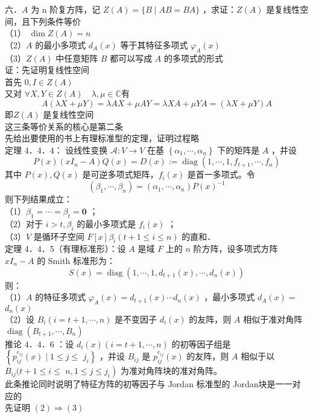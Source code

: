 \documentclass[UTF8]{ctexart}
\begin{document}
\noindent 六．$A$ 为 n 阶复方阵，记 $Z(A)=\{B \mid A B=B A\}$ ，求证：$Z(A)$ 是复线性空间，且下列条件等价\\
（1） $\operatorname{dim} Z(A)=n$\\
（2）$A$ 的最小多项式 $d_{A}(x)$ 等于其特征多项式 $\varphi_{A}(x)$\\
（3）$Z(A)$ 中任意矩阵 $B$ 都可以写成 $A$ 的多项式的形式\\
证：先证明复线性空间\\
首先 $0, I \in Z(A)$\\
又对 $\forall X, Y \in Z(A) \quad \lambda, \mu \in \mathbb{C}$有
$$A(\lambda X+\mu Y)=\lambda A X+\mu A Y=\lambda X A+\mu Y A=(\lambda X+\mu Y) A$$
即$Z(A)$ 是复线性空间\\
这三条等价关系的核心是第二条\\
先给出要使用的书上有理标准型的定理，证明过程略\\
定理 4．4．4： 设线性变换 $\mathcal{A}: V \rightarrow V$ 在基 $\left\{\alpha_{1}, \cdots, \alpha_{n}\right\}$ 下的矩阵是 $A$ ，并设
$$
P(x)\left(x I_{n}-A\right) Q(x)=D(x):=\operatorname{diag}\left(1, \cdots, 1, f_{t+1}, \cdots, f_{n}\right)
$$
其中 $P(x), Q(x)$ 是可逆多项式矩阵，$f_{i}(x)$ 是首一多项式。令
$$
\left(\beta_{1}, \cdots, \beta_{n}\right)=\left(\alpha_{1}, \cdots, \alpha_{n}\right) P(x)^{-1}
$$
则下列结果成立：\\
（1）$\beta_{1}=\cdots=\beta_{t}=\mathbf{0}$ ；\\
（2）对于 $i>t, \beta_{i}$ 的最小多项式是 $f_{i}(x)$ ；\\
（3）$V$ 是循环子空间 $F[x] \beta_{i}(t+1 \leq i \leq n)$ 的直和．\\
定理 4．4．5（有理标准形）：设 $A$ 是域 $F$ 上的 $n$ 阶方阵，设多项式方阵 $x I_{n}-A$ 的 Smith 标准形为：
$$S(x)=\operatorname{diag}\left(1, \cdots, 1, d_{t+1}(x), \cdots, d_{n}(x)\right)$$
则：\\
（1）$A$ 的特征多项式 $\varphi_{A}(x)=d_{t+1}(x) \cdots d_{n}(x)$ ，最小多项式 $d_{A}(x)=$ $d_{n}(x)$\\
（2）设 $B_{i}(i=t+1, \cdots, n)$ 是不变因子 $d_{i}(x)$ 的友阵，则 $A$ 相似于准对角阵 $\operatorname{diag}\left(B_{t+1}, \cdots, B_{n}\right)$ \\
推论 4．4．6 ：设 $d_{i}(x)(i=t+1, \cdots, n)$ 的初等因子组是 $\left\{p_{i j}^{e_{i j}}(x) \mid 1 \leq j \leq\right.$ $\left.j_{i}\right\}$ ，并设 $B_{i j}$ 是 $p_{i j}^{e_{i j}}(x)$ 的友阵，则 $A$ 相似于以 $B_{i j}(t+1 \leq i \leq$ $\left.n, 1 \leq j \leq j_{i}\right)$ 为准对角阵块的准对角阵。\\
此条推论同时说明了特征方阵的初等因子与 Jordan 标准型的 Jordan块是一一对应的\\
先证明 $(2) \Rightarrow(3)$\\
\end{document}
